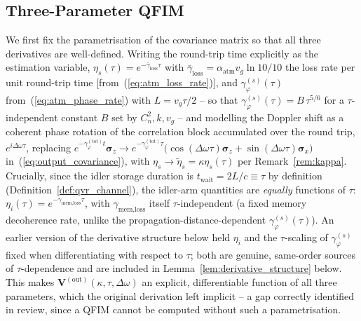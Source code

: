 \documentclass[journal]{IEEEtran}
\begin{document}
\subsection{Three-Parameter QFIM}

We first fix the parametrisation of the covariance matrix so that all three derivatives are well-defined. Writing the round-trip time explicitly as the estimation variable, $\eta_s(\tau) = e^{-\bar\gamma_{\text{loss}}\tau}$ with $\bar\gamma_{\text{loss}}=\alpha_{\text{atm}}v_g\ln10/10$ the loss rate per unit round-trip time [from~(\ref{eq:atm_loss_rate})], and $\gamma_\varphi^{(s)}(\tau)$ from~(\ref{eq:atm_phase_rate}) with $L=v_g\tau/2$ -- so that $\gamma_\varphi^{(s)}(\tau) = B\,\tau^{5/6}$ for a $\tau$-independent constant $B$ set by $C_n^2,k,v_g$ -- and modelling the Doppler shift as a coherent phase rotation of the correlation block accumulated over the round trip, $e^{i\Delta\omega\tau}$, replacing $e^{-\gamma_\varphi^{(\text{tot})}t}\boldsymbol\sigma_z \to e^{-\gamma_\varphi^{(\text{tot})}\tau}\big(\cos(\Delta\omega\tau)\boldsymbol\sigma_z+\sin(\Delta\omega\tau)\boldsymbol\sigma_x\big)$ in~(\ref{eq:output_covariance}), with $\eta_s\to\tilde\eta_s=\kappa\eta_s(\tau)$ per Remark~\ref{rem:kappa}. Crucially, since the idler storage duration is $t_{\text{wait}}=2L/c\equiv\tau$ by definition (Definition~\ref{def:qvr_channel}), the idler-arm quantities are \emph{equally} functions of $\tau$: $\eta_i(\tau)=e^{-\gamma_{\text{mem,loss}}\tau}$, with $\gamma_{\text{mem,loss}}$ itself $\tau$-independent (a fixed memory decoherence rate, unlike the propagation-distance-dependent $\gamma_\varphi^{(s)}(\tau)$). An earlier version of the derivative structure below held $\eta_i$ and the $\tau$-scaling of $\gamma_\varphi^{(s)}$ fixed when differentiating with respect to $\tau$; both are genuine, same-order sources of $\tau$-dependence and are included in Lemma~\ref{lem:derivative_structure} below. This makes $\mathbf V^{(\text{out})}(\kappa,\tau,\Delta\omega)$ an explicit, differentiable function of all three parameters, which the original derivation left implicit -- a gap correctly identified in review, since a QFIM cannot be computed without such a parametrisation.
\end{document}
